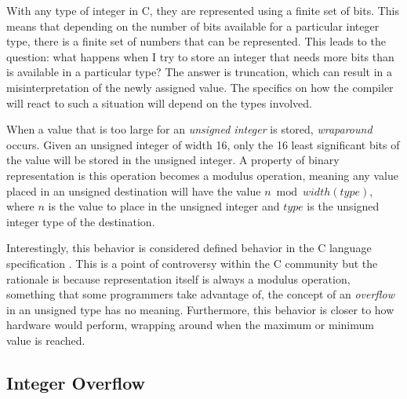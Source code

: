 With any type of integer in C, they are represented using a finite set of bits. This means that depending on the number of bits available for a particular integer type, there is a finite set of numbers that can be represented. This leads to the question: what happens when I try to store an integer that needs more bits than is available in a particular type? The answer is truncation, which can result in a misinterpretation of the newly assigned value. The specifics on how the compiler will react to such a situation will depend on the types involved.

When a value that is too large for an \textit{unsigned integer} is stored, \textit{wraparound} occurs. Given an unsigned integer of width 16, only the 16 least significant bits of the value will be stored in the unsigned integer. A property of binary representation is this operation becomes a modulus operation, meaning any value placed in an unsigned destination will have the value $n \bmod width(type)$, where $n$ is the value to place in the unsigned integer and $type$ is the unsigned integer type of the destination.

Interestingly, this behavior is considered defined behavior in the C language specification \cite{c_standard}. This is a point of controversy within the C community but the rationale is because representation itself is always a modulus operation, something that some programmers take advantage of, the concept of an \textit{overflow} in an unsigned type has no meaning. Furthermore, this behavior is closer to how hardware would perform, wrapping around when the maximum or minimum value is reached.

\subsection{Integer Overflow}

